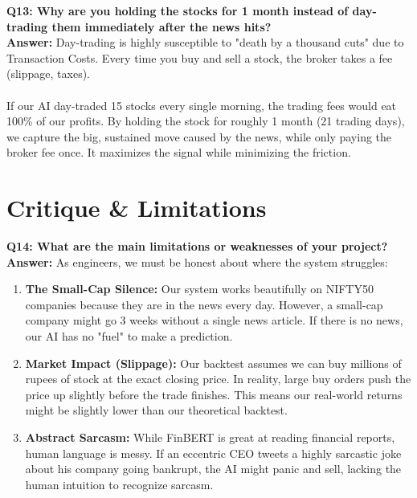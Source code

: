 \documentclass[11pt, a4paper]{article}
\begin{document}
\textbf{\textcolor{IITBlue}{Q13: Why are you holding the stocks for 1 month instead of day-trading them immediately after the news hits?}} \\
\textbf{Answer:} Day-trading is highly susceptible to "death by a thousand cuts" due to Transaction Costs. Every time you buy and sell a stock, the broker takes a fee (slippage, taxes). 
\\ \\
If our AI day-traded 15 stocks every single morning, the trading fees would eat 100\% of our profits. By holding the stock for roughly 1 month (21 trading days), we capture the big, sustained move caused by the news, while only paying the broker fee once. It maximizes the signal while minimizing the friction.

\section*{Critique \& Limitations}

\textbf{\textcolor{IITBlue}{Q14: What are the main limitations or weaknesses of your project?}} \\
\textbf{Answer:} As engineers, we must be honest about where the system struggles:
\begin{enumerate}
    \item \textbf{The Small-Cap Silence:} Our system works beautifully on NIFTY50 companies because they are in the news every day. However, a small-cap company might go 3 weeks without a single news article. If there is no news, our AI has no "fuel" to make a prediction.
    \item \textbf{Market Impact (Slippage):} Our backtest assumes we can buy millions of rupees of stock at the exact closing price. In reality, large buy orders push the price up slightly before the trade finishes. This means our real-world returns might be slightly lower than our theoretical backtest.
    \item \textbf{Abstract Sarcasm:} While FinBERT is great at reading financial reports, human language is messy. If an eccentric CEO tweets a highly sarcastic joke about his company going bankrupt, the AI might panic and sell, lacking the human intuition to recognize sarcasm.
\end{enumerate}
\end{document}
